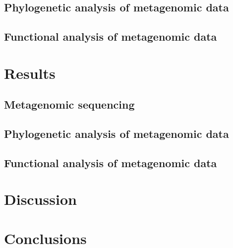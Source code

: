 \subsection{Phylogenetic analysis of metagenomic data}
\subsection{Functional analysis of metagenomic data}

\section{Results}
\subsection{Metagenomic sequencing}
\subsection{Phylogenetic analysis of metagenomic data}
\subsection{Functional analysis of metagenomic data}

\section{Discussion}

\section{Conclusions}

